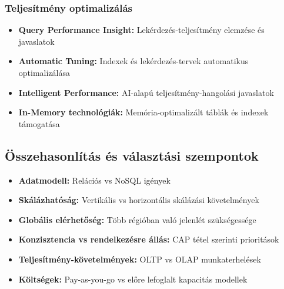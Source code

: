 \documentclass[a4paper,12pt]{article}
\begin{document}
    \subsubsection{Teljesítmény optimalizálás}

    \begin{itemize}
        \item \textbf{Query Performance Insight:} Lekérdezés-teljesítmény elemzése és javaslatok
        \item \textbf{Automatic Tuning:} Indexek és lekérdezés-tervek automatikus optimalizálása
        \item \textbf{Intelligent Performance:} AI-alapú teljesítmény-hangolási javaslatok
        \item \textbf{In-Memory technológiák:} Memória-optimalizált táblák és indexek támogatása
    \end{itemize}

    \subsection{Összehasonlítás és választási szempontok}

    \begin{itemize}
        \item \textbf{Adatmodell:} Relációs vs NoSQL igények
        \item \textbf{Skálázhatóság:} Vertikális vs horizontális skálázási követelmények
        \item \textbf{Globális elérhetőség:} Több régióban való jelenlét szükségessége
        \item \textbf{Konzisztencia vs rendelkezésre állás:} CAP tétel szerinti prioritások
        \item \textbf{Teljesítmény-követelmények:} OLTP vs OLAP munkaterhelések
        \item \textbf{Költségek:} Pay-as-you-go vs előre lefoglalt kapacitás modellek
    \end{itemize}
\end{document}
